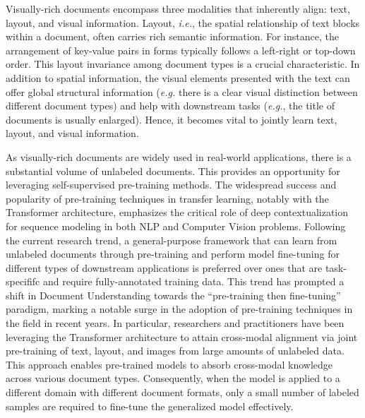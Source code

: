 

Visually-rich documents encompass three modalities that inherently align: text, layout, and visual information. Layout, \textit{i.e.}, the spatial relationship of text blocks within a document, often carries rich semantic information. For instance, the arrangement of key-value pairs in forms typically follows a left-right or top-down order. This layout invariance among document types is a crucial characteristic. In addition to spatial information, the visual elements presented with the text can offer global structural information (\textit{e.g.} there is a clear visual distinction between different document types) and help with downstream tasks (\textit{e.g.}, the title of documents is usually enlarged). Hence, it becomes vital to jointly learn text, layout, and visual information.

As visually-rich documents are widely used in real-world applications, there is a substantial volume of unlabeled documents. This provides an opportunity for leveraging self-supervised pre-training methods. The widespread success and popularity of pre-training techniques in transfer learning, notably with the Transformer architecture, emphasizes the critical role of deep contextualization for sequence modeling in both \ac{NLP} and Computer Vision problems. Following the current research trend, a general-purpose framework that can learn from unlabeled documents through pre-training and perform model fine-tuning for different types of downstream applications is preferred over ones that are task-specififc and require fully-annotated training data. This trend has prompted a shift in Document Understanding towards the “pre-training then fine-tuning” paradigm, marking a notable surge in the adoption of pre-training techniques in the field in recent years. In particular, researchers and practitioners have been leveraging the Transformer architecture to attain cross-modal alignment via joint pre-training of text, layout, and images from large amounts of unlabeled data. This approach enables pre-trained models to absorb cross-modal knowledge across various document types. Consequently, when the model is applied to a different domain with different document formats, only a small number of labeled samples are required to fine-tune the generalized model effectively. 

